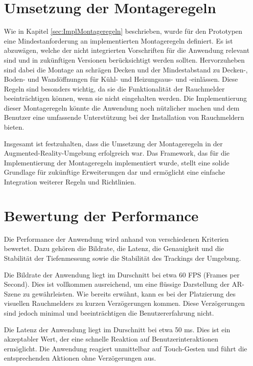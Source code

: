 \section{Umsetzung der Montageregeln}

Wie in Kapitel \ref{sec:ImplMontageregeln} beschrieben, wurde für den Prototypen eine Mindestanforderung an implementierten Montageregeln definiert. Es ist abzuwägen, welche der nicht integrierten Vorschriften für die Anwendung relevant sind und in zukünftigen Versionen berücksichtigt werden sollten. Hervorzuheben sind dabei die Montage an schrägen Decken und der Mindestabstand zu Decken-, Boden- und Wandöffnungen für Kühl- und Heizungsaus- und -einlässen. Diese Regeln sind besonders wichtig, da sie die Funktionalität der Rauchmelder beeinträchtigen können, wenn sie nicht eingehalten werden. Die Implementierung dieser Montageregeln könnte die Anwendung noch nützlicher machen und dem Benutzer eine umfassende Unterstützung bei der Installation von Rauchmeldern bieten.

Insgesamt ist festzuhalten, dass die Umsetzung der Montageregeln in der Augmented-Reality-Umgebung erfolgreich war. Das Framework, das für die Implementierung der Montageregeln implementiert wurde, stellt eine solide Grundlage für zukünftige Erweiterungen dar und ermöglicht eine einfache Integration weiterer Regeln und Richtlinien.

\section{Bewertung der Performance}

Die Performance der Anwendung wird anhand von verschiedenen Kriterien bewertet. Dazu gehören die Bildrate, die Latenz, die Genauigkeit und die Stabilität der Tiefenmessung sowie die Stabilität des Trackings der Umgebung.

Die Bildrate der Anwendung liegt im Durschnitt bei etwa 60 FPS (Frames per Second). Dies ist vollkommen ausreichend, um eine flüssige Darstellung der AR-Szene zu gewährleisten. Wie bereits erwähnt, kann es bei der Platzierung des visuellen Rauchmelders zu kurzen Verzögerungen kommen. Diese Verzögerungen sind jedoch minimal und beeinträchtigen die Benutzererfahrung nicht.

Die Latenz der Anwendung liegt im Durschnitt bei etwa 50 ms. Dies ist ein akzeptabler Wert, der eine schnelle Reaktion auf Benutzerinteraktionen ermöglicht. Die Anwendung reagiert unmittelbar auf Touch-Gesten und führt die entsprechenden Aktionen ohne Verzögerungen aus.

